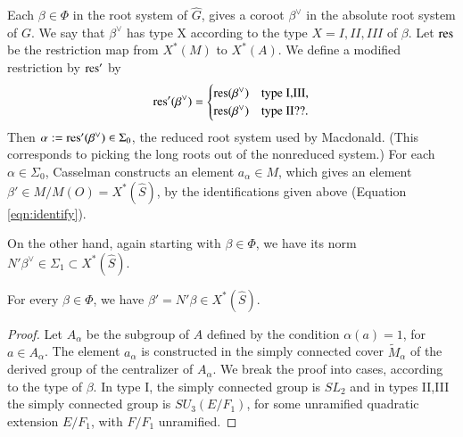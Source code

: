 
Each $\beta\in \Phi$ in the root system of $\hat G$, gives a
 coroot $\beta^\vee$ in the absolute root system of $G$.  We say that $\beta^\vee$ has type X according to
the type $X=I,II,III$ of $\beta$.
Let ${\operatorname{res}}$ be the restriction map from $X^*(M)$ to $X^*(A)$.
We define a modified restriction by ${\operatorname{res}}'$ by
\[
{\operatorname{res}}' (\beta^\vee) = \begin{cases}
{\operatorname{res}}(\beta^\vee) & \text{type I,III},\\
{\operatorname{res}}(\beta^\vee) & \text{type II??}.
\end{cases}
\]
Then $\alpha:={\operatorname{res}}'(\beta^\vee)\in \Sigma_0$, the reduced root system used by Macdonald.
(This corresponds to picking the long roots out of the nonreduced system.)
For each $\alpha\in\Sigma_0$,
Casselman constructs an element $a_\alpha \in M$, which gives an element $\beta'\in M/M(O) = X^*(\hat S)$,
by the identifications given above (Equation \ref{eqn:identify}).  

On the other hand, again starting with $\beta\in\Phi$, we have its norm $N'\beta^\vee\in \Sigma_1 \subset X^*(\hat S)$. 


\begin{lemma} For every $\beta\in\Phi$, we have $\beta' = N'\beta\in X^*(\hat S)$.
\end{lemma}

\begin{proof}    
Let $A_{\alpha}$ be the subgroup of $A$ defined by the condition $\alpha(a)=1$, for $a\in A_\alpha$.
The element $a_\alpha$ is constructed in the simply connected cover $\tilde M_\alpha$ of the derived
group of the centralizer of $A_\alpha$.   We break the proof into cases, according to the type of $\beta$.  In type I,
the simply connected group is $SL_2$ and in types II,III the simply connected group is $SU_3(E/F_1)$, for some unramified
quadratic extension $E/F_1$, with $F/F_1$ unramified.
\end{proof}

